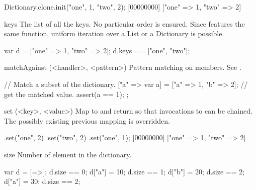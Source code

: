 \begin{urbiscriptapi}
\begin{urbiscript}
Dictionary.clone.init("one", 1, "two", 2);
[00000000] ["one" => 1, "two" => 2]
\end{urbiscript}


\item[keys]%
  The list of all the keys.  No particular order is ensured.  Since
   features the same function, uniform iteration over
  a List or a Dictionary is possible.
\begin{urbiassert}
var d = ["one" => 1, "two" => 2];
d.keys == ["one", "two"];
\end{urbiassert}


\item[matchAgainst](<handler>, <pattern>)
  Pattern matching on members.  See .

\begin{urbiscript}
{
  // Match a subset of the dictionary.
  ["a" => var a] = ["a" => 1, "b" => 2];
  // get the matched value.
  assert(a == 1);
};
\end{urbiscript}


\item[set](<key>, <value>)%
  Map  to  and return \this so that invocations to
   can be chained.  The possibly existing previous mapping is
  overridden.

\begin{urbiscript}
[=>].set("one", 2)
    .set("two", 2)
    .set("one", 1);
[00000000] ["one" => 1, "two" => 2]
\end{urbiscript}


\item[size]
  Number of element in the dictionary.

\begin{urbiassert}
var d = [=>];  d.size == 0;
d["a"] = 10;   d.size == 1;
d["b"] = 20;   d.size == 2;
d["a"] = 30;   d.size == 2;
\end{urbiassert}



\end{urbiscriptapi}


